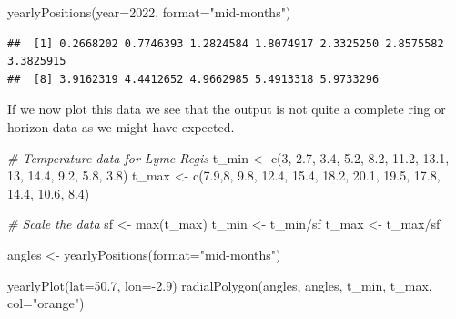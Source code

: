 \documentclass[
]{book}
\newenvironment{Shaded}{\begin{snugshade}}{\end{snugshade}}
\newcommand{\AttributeTok}[1]{\textcolor[rgb]{0.77,0.63,0.00}{#1}}
\newcommand{\CommentTok}[1]{\textcolor[rgb]{0.56,0.35,0.01}{\textit{#1}}}
\newcommand{\DecValTok}[1]{\textcolor[rgb]{0.00,0.00,0.81}{#1}}
\newcommand{\FloatTok}[1]{\textcolor[rgb]{0.00,0.00,0.81}{#1}}
\newcommand{\FunctionTok}[1]{\textcolor[rgb]{0.00,0.00,0.00}{#1}}
\newcommand{\NormalTok}[1]{#1}
\newcommand{\OtherTok}[1]{\textcolor[rgb]{0.56,0.35,0.01}{#1}}
\newcommand{\SpecialCharTok}[1]{\textcolor[rgb]{0.00,0.00,0.00}{#1}}
\newcommand{\StringTok}[1]{\textcolor[rgb]{0.31,0.60,0.02}{#1}}
\begin{document}
\begin{Shaded}
\begin{Highlighting}[]
\FunctionTok{yearlyPositions}\NormalTok{(}\AttributeTok{year=}\DecValTok{2022}\NormalTok{, }\AttributeTok{format=}\StringTok{"mid{-}months"}\NormalTok{)}
\end{Highlighting}
\end{Shaded}

\begin{verbatim}
##  [1] 0.2668202 0.7746393 1.2824584 1.8074917 2.3325250 2.8575582 3.3825915
##  [8] 3.9162319 4.4412652 4.9662985 5.4913318 5.9733296
\end{verbatim}

If we now plot this data we see that the output is not quite a complete ring or horizon data as we might have expected.

\begin{Shaded}
\begin{Highlighting}[]
\CommentTok{\# Temperature data for Lyme Regis}
\NormalTok{t\_min }\OtherTok{\textless{}{-}} \FunctionTok{c}\NormalTok{(}\DecValTok{3}\NormalTok{, }\FloatTok{2.7}\NormalTok{, }\FloatTok{3.4}\NormalTok{, }\FloatTok{5.2}\NormalTok{, }\FloatTok{8.2}\NormalTok{, }\FloatTok{11.2}\NormalTok{, }\FloatTok{13.1}\NormalTok{, }\DecValTok{13}\NormalTok{, }\FloatTok{14.4}\NormalTok{, }\FloatTok{9.2}\NormalTok{, }\FloatTok{5.8}\NormalTok{, }\FloatTok{3.8}\NormalTok{)}
\NormalTok{t\_max }\OtherTok{\textless{}{-}} \FunctionTok{c}\NormalTok{(}\FloatTok{7.9}\NormalTok{,}\DecValTok{8}\NormalTok{, }\FloatTok{9.8}\NormalTok{, }\FloatTok{12.4}\NormalTok{, }\FloatTok{15.4}\NormalTok{, }\FloatTok{18.2}\NormalTok{, }\FloatTok{20.1}\NormalTok{, }\FloatTok{19.5}\NormalTok{, }\FloatTok{17.8}\NormalTok{, }\FloatTok{14.4}\NormalTok{, }\FloatTok{10.6}\NormalTok{, }\FloatTok{8.4}\NormalTok{)}

\CommentTok{\# Scale the data}
\NormalTok{sf }\OtherTok{\textless{}{-}} \FunctionTok{max}\NormalTok{(t\_max)}
\NormalTok{t\_min }\OtherTok{\textless{}{-}}\NormalTok{ t\_min}\SpecialCharTok{/}\NormalTok{sf}
\NormalTok{t\_max }\OtherTok{\textless{}{-}}\NormalTok{ t\_max}\SpecialCharTok{/}\NormalTok{sf}

\NormalTok{angles }\OtherTok{\textless{}{-}} \FunctionTok{yearlyPositions}\NormalTok{(}\AttributeTok{format=}\StringTok{"mid{-}months"}\NormalTok{)}

\FunctionTok{yearlyPlot}\NormalTok{(}\AttributeTok{lat=}\FloatTok{50.7}\NormalTok{, }\AttributeTok{lon=}\SpecialCharTok{{-}}\FloatTok{2.9}\NormalTok{)}
\FunctionTok{radialPolygon}\NormalTok{(angles, angles, t\_min, t\_max, }\AttributeTok{col=}\StringTok{"orange"}\NormalTok{)}
\end{Highlighting}
\end{Shaded}
\end{document}

